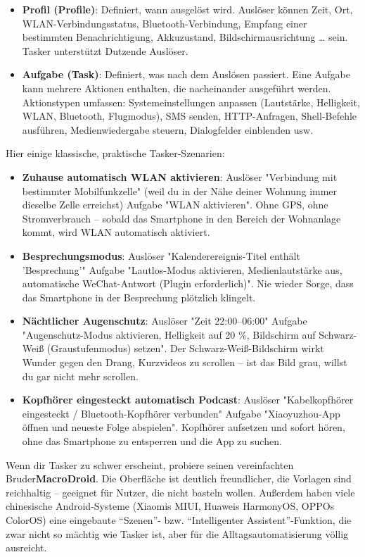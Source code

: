 \begin{itemize}
  \item \textbf{Profil (Profile)}: Definiert, wann ausgelöst wird. Auslöser können Zeit, Ort, WLAN-Verbindungsstatus, Bluetooth-Verbindung, Empfang einer bestimmten Benachrichtigung, Akkuzustand, Bildschirmausrichtung … sein. Tasker unterstützt Dutzende Auslöser.
  \item \textbf{Aufgabe (Task)}: Definiert, was nach dem Auslösen passiert. Eine Aufgabe kann mehrere Aktionen enthalten, die nacheinander ausgeführt werden. Aktionstypen umfassen: Systemeinstellungen anpassen (Lautstärke, Helligkeit, WLAN, Bluetooth, Flugmodus), SMS senden, HTTP-Anfragen, Shell-Befehle ausführen, Medienwiedergabe steuern, Dialogfelder einblenden usw.
\end{itemize}

Hier einige klassische, praktische Tasker-Szenarien:

\begin{itemize}
  \item \textbf{Zuhause automatisch WLAN aktivieren}: Auslöser "Verbindung mit bestimmter Mobilfunkzelle" (weil du in der Nähe deiner Wohnung immer dieselbe Zelle erreichst) Aufgabe "WLAN aktivieren". Ohne GPS, ohne Stromverbrauch – sobald das Smartphone in den Bereich der Wohnanlage kommt, wird WLAN automatisch aktiviert.
  \item \textbf{Besprechungsmodus}: Auslöser "Kalenderereignis-Titel enthält 'Besprechung'" Aufgabe "Lautlos-Modus aktivieren, Medienlautstärke aus, automatische WeChat-Antwort (Plugin erforderlich)". Nie wieder Sorge, dass das Smartphone in der Besprechung plötzlich klingelt.
  \item \textbf{Nächtlicher Augenschutz}: Auslöser "Zeit 22:00–06:00" Aufgabe "Augenschutz-Modus aktivieren, Helligkeit auf 20 \%, Bildschirm auf Schwarz-Weiß (Graustufenmodus) setzen". Der Schwarz-Weiß-Bildschirm wirkt Wunder gegen den Drang, Kurzvideos zu scrollen – ist das Bild grau, willst du gar nicht mehr scrollen.
  \item \textbf{Kopfhörer eingesteckt automatisch Podcast}: Auslöser "Kabelkopfhörer eingesteckt / Bluetooth-Kopfhörer verbunden" Aufgabe "Xiaoyuzhou-App öffnen und neueste Folge abspielen". Kopfhörer aufsetzen und sofort hören, ohne das Smartphone zu entsperren und die App zu suchen.
\end{itemize}

Wenn dir Tasker zu schwer erscheint, probiere seinen vereinfachten Bruder\textbf{MacroDroid}. Die Oberfläche ist deutlich freundlicher, die Vorlagen sind reichhaltig – geeignet für Nutzer, die nicht basteln wollen. Außerdem haben viele chinesische Android-Systeme (Xiaomis MIUI, Huaweis HarmonyOS, OPPOs ColorOS) eine eingebaute “Szenen”- bzw. “Intelligenter Assistent”-Funktion, die zwar nicht so mächtig wie Tasker ist, aber für die Alltagsautomatisierung völlig ausreicht.

